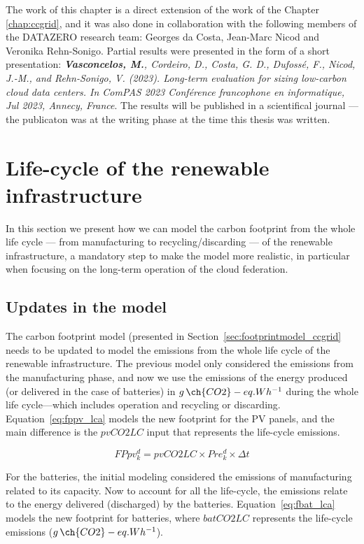 The work of this chapter is a direct extension of the work of the Chapter \ref{chap:ccgrid}, and it was also done in collaboration with the following members of the DATAZERO\cite{datazero} research team: Georges da Costa, Jean-Marc Nicod and Veronika Rehn-Sonigo. Partial results were presented in the form of a short presentation:   \textit{\textbf{Vasconcelos, M.}, Cordeiro, D., Costa, G. D., Dufossé, F., Nicod, J.-M., and Rehn-Sonigo, V. (2023). Long-term evaluation for sizing low-carbon cloud data centers. In ComPAS 2023 Conférence francophone en informatique, Jul 2023, Annecy, France}. The results will be published in a scientifical journal --- the publicaton was at the writing phase at the time this thesis was written. 




\section{Life-cycle of the renewable infrastructure}
\label{sec:lifecicle}

In this section we present how we can model the carbon footprint from the whole life cycle --- from manufacturing to recycling/discarding --- of the renewable infrastructure,  a mandatory step to make the model more realistic, in particular when focusing on the long-term operation of the cloud federation.

\subsection{Updates in the model}

The carbon footprint model (presented in Section~\ref{sec:footprintmodel_ccgrid} needs to be updated to model the  emissions from the whole life cycle of the renewable infrastructure.  The previous model only considered the  emissions from the manufacturing phase, and now we use the emissions of the energy produced (or
delivered in the case of batteries) in $g\,\ch{CO2}-eq.Wh^{-1}$ during the whole life cycle---which includes operation and recycling or discarding. Equation~\eqref{eq:fppv_lca} models the new footprint for the PV panels, and the main difference is the $pvCO2LC$ input that represents the life-cycle emissions.

\begin{equation} \label{eq:fppv_lca}
   FPpv^d_k =  pvCO2LC \times Pre_k^d \times \Delta t
\end{equation}


For the batteries, the initial modeling considered the emissions of manufacturing related to its capacity. Now to account for all the life-cycle, the emissions relate to the energy delivered (discharged) by the batteries. Equation~\eqref{eq:fbat_lca} models the new footprint for batteries, where $batCO2LC$ represents the life-cycle emissions  ($g\,\ch{CO2}-eq.Wh^{-1}$).

